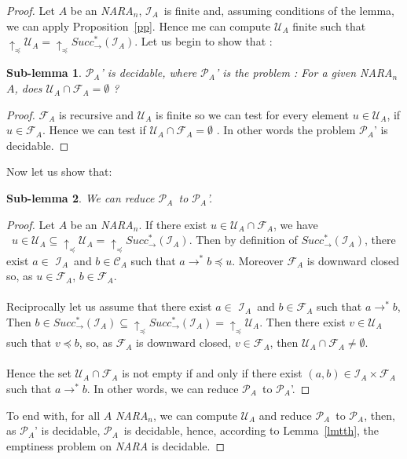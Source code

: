 \documentclass[a4paper,10pt]{report}
\newtheorem{slm}{Sub-lemma}[lm]
\theoremstyle{remark}
\newcommand{\C}{\mathcal{C}_{A}}
\newcommand{\I}{\mathcal{I}_{A}}
\newcommand{\F}{\mathcal{F}_{A}}
\newcommand{\U}{\mathcal{U}_{A}}
\newcommand{\pb}{$\mathcal{P}_{A}$}
\begin{document}
\begin{proof} 
  Let $A$ be an \textit{NARA}$_n$,
  $\I$\ is finite and, assuming conditions of the lemma, we can apply Proposition~\ref{pp}.
  Hence me can compute $\U$ finite such that $\uparrow_\preceq \U=\uparrow_\preceq Succ^*_\rightarrow (\I)$.
  Let us begin to show that :
  \begin{slm}	
    \pb' is decidable, where \pb' is the problem : For a given \textit{NARA}$_n$ $A$, does $\U \cap \F =\emptyset$ ? 
  \end{slm}
  \begin{proof}
  $\F$ is recursive and $\U$ is finite so we can test for every element $u \in \U$, if $u \in\F$. Hence we can test if $\U \cap\F=\emptyset$ . 
  In other words the problem \pb' is decidable.
  \end{proof}
  Now let us show that:
  \begin{slm}	
    We can reduce \pb\ to \pb'.
  \end{slm}
  \begin{proof}
  Let $A$ be an \textit{NARA}$_n$.
  If there exist $u \in \U \cap \F$, we have \\\ $u\in \U \subseteq \uparrow_\preceq  \U =\uparrow_\preceq Succ^*_\rightarrow (\I)$. 
  Then by definition of $Succ^*_\rightarrow (\I)$, there exist $a\in$ $\I$\ and $b \in\C$ such that $a \rightarrow^* b \preceq u$.
  Moreover $\F$ is downward closed so, as $u \in \F$,  $b \in \F$.
  \paragraph{}
  Reciprocally let us assume that there exist $a\in$ $\I$\ and $b \in\F$ such that $a \rightarrow^* b $,
  Then $b \in  Succ^*_\rightarrow (\I) \subseteq \uparrow_\preceq Succ^*_\rightarrow (\I)=\uparrow_\preceq  \U$. 
  Then there exist $v \in \U$ such that $v \preceq b$, so, as $\F$ is downward closed, $v \in \F$, then $\U \cap \F \neq \emptyset$.
  \paragraph{}
  Hence the set $\U \cap \F$ is not empty if and only if there exist  $(a,b)\in \I \times \F$ such that $a \rightarrow^* b$.
  In other words, we can reduce \pb\ to \pb'.  
  \end{proof}
  To end with, for all $A$  \textit{NARA}$_n$, we can compute $\U$ and reduce \pb\ to \pb, then, as \pb' is decidable, \pb\ is decidable, hence, according to Lemma~\ref{lmtth}, the emptiness problem on \textit{NARA} is decidable.
\end{proof}
\end{document}
